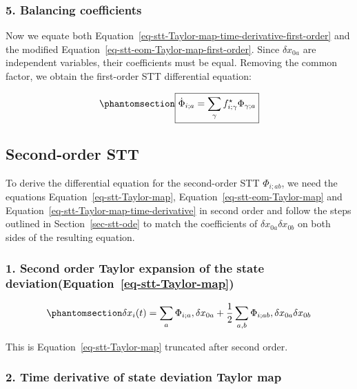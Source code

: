 \documentclass[
  letterpaper,
  DIV=11,
  numbers=noendperiod,
  oneside]{scrartcl}
\begin{document}
\subsubsection{5. Balancing coefficients}\label{balancing-coefficients}

Now we equate both
Equation~\ref{eq-stt-Taylor-map-time-derivative-first-order} and the
modified Equation~\ref{eq-stt-eom-Taylor-map-first-order}. Since
\(\delta x_{0a}\) are independent variables, their coefficients must be
equal. Removing the common factor, we obtain the first-order STT
differential equation:

\begin{equation}\protect\phantomsection\label{eq-first-order-stt-differential-equation}{
\boxed{
\dot\Phi_{i;a} = \sum_{\gamma} f^\star_{i;\gamma}\Phi_{\gamma;a}
}
}\end{equation}

\subsection{Second-order STT}\label{second-order-stt}

To derive the differential equation for the second-order STT
\(\Phi_{i;ab}\), we need the equations Equation~\ref{eq-stt-Taylor-map},
Equation~\ref{eq-stt-eom-Taylor-map} and
Equation~\ref{eq-stt-Taylor-map-time-derivative} in second order and
follow the steps outlined in Section~\ref{sec-stt-ode} to match the
coefficients of \(\delta x_{0a}\delta x_{0b}\) on both sides of the
resulting equation.

\subsubsection{\texorpdfstring{1. Second order Taylor expansion of the
state
deviation(Equation~\ref{eq-stt-Taylor-map})}{1. Second order Taylor expansion of the state deviation(Equation~)}}\label{second-order-taylor-expansion-of-the-state-deviationeq-stt-taylor-map}

\begin{equation}\protect\phantomsection\label{eq-stt-Taylor-map-second-order}{
\delta x_i(t) = \sum_a\Phi_{i;a},\delta x_{0a} + \frac12\sum_{a,b}\Phi_{i;ab},\delta x_{0a}\delta x_{0b}
}\end{equation}

This is Equation~\ref{eq-stt-Taylor-map} truncated after second order.

\subsubsection{2. Time derivative of state deviation Taylor
map}\label{time-derivative-of-state-deviation-taylor-map-1}
\end{document}

